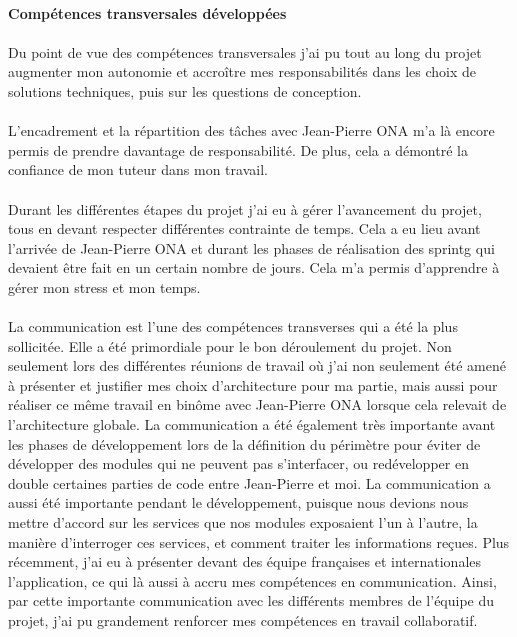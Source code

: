 \documentclass[12pt,a4paper]{report}
\begin{document}
\paragraph{Compétences transversales développées}
\paragraph*{}Du point de vue des compétences transversales j'ai pu tout au long du projet augmenter mon autonomie et accroître mes responsabilités dans les choix de solutions techniques, puis sur les questions de conception.
\paragraph*{}L'encadrement et la répartition des tâches avec Jean-Pierre ONA m'a là encore permis de prendre davantage de responsabilité. De plus, cela a démontré la confiance de mon tuteur dans mon travail.
\paragraph*{}Durant les différentes étapes du projet j'ai eu à gérer l'avancement du projet, tous en devant respecter différentes contrainte de temps. Cela a eu lieu avant l'arrivée de Jean-Pierre ONA et durant les phases de réalisation des \gls{sprintg} qui devaient être fait en un certain nombre de jours. Cela m'a permis d'apprendre à gérer mon stress et mon temps.
\paragraph*{}La communication est l’une des compétences transverses qui a été la plus
sollicitée. Elle a été primordiale pour le bon déroulement du projet. Non seulement lors des différentes réunions de travail où j’ai non seulement été amené à présenter et justifier mes choix d’architecture pour ma partie, mais aussi pour réaliser ce même travail en binôme avec Jean-Pierre ONA lorsque cela relevait de l’architecture globale. La communication a été également très importante avant les phases de développement lors de la définition du périmètre pour éviter de développer des modules qui ne peuvent pas s’interfacer, ou redévelopper en double certaines parties de code entre Jean-Pierre et moi. La communication a aussi été importante pendant le développement, puisque nous devions nous mettre d’accord sur les services que nos modules exposaient l’un à l’autre, la manière d’interroger ces services, et comment traiter les informations reçues. Plus récemment, j'ai eu à présenter devant des équipe françaises et internationales l'application, ce qui là aussi à accru mes compétences en communication. Ainsi, par cette importante communication avec les différents membres de l’équipe du projet, j’ai pu grandement renforcer mes compétences en travail collaboratif. 
\end{document}
